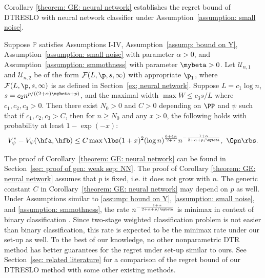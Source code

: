 \documentclass[preprint] {imsart}
\begin{document}
 Corollary \ref{theorem: GE: neural network} establishes the regret bound of  DTRESLO  with neural network classifier under Assumption~\ref{assumption: small noise}.
 \begin{corollary}
 \label{theorem: GE: neural network}
 Suppose $\mathbb P$ satisfies Assumptions I-IV,  Assumption~\ref{assump: bound on Y}, Assumption~\ref{assumption: small noise} with parameter $\alpha>0$, and Assumption~\ref{assumption: smmothness} with parameter $\mybeta>0$.
Let $\mathcal U_{n,1}$ and $\mathcal U_{n,2}$ be of the form $\mathcal F(L,\p, s, \infty)$ with appropriate  $\p_1$, where  $\mathcal F(L,\p, s, \infty)$ is as defined in Section~\ref{ex; neural network}. Suppose $L=c_1\log n$,  $s=c_2 n^{p/((2+\alpha)\mybeta+p)}$, and the maximal width $\max W\leq c_3 s/L$ where $c_1,c_2,c_3>0$. Then there exist $N_0>0$ and $C>0$ depending on $\PP$ and $\psi$ such that if $c_1,c_2,c_3>C$,  then for  $n\geq N_0$ and any $x>0$, the following holds with probability at least $1-\exp(-x)$:
 \[V^*_\psi-V_\psi(\hfa,\hfb)\leq C\max\lbs (1+x)^2(\log n)^{\frac{6+4\alpha}{2+\alpha}}n^{-\frac{1+\alpha}{2+\alpha+p/\mybeta}},\ \Opn\rbs.\]
 \end{corollary}
 The proof of Corollary~\ref{theorem: GE: neural network} can be found in Section~\ref{sec: proof of gen: weak sep: NN}. The proof of Corollary  \ref{theorem: GE: neural network} assumes that $p$ is fixed, i.e. it does not grow with $n$. The generic constant $C$ in Corollary~\ref{theorem: GE: neural network} may depend on $p$ as well.
 Under Assumptions similar to \ref{assump: bound on Y}, \ref{assumption: small noise}, and \ref{assumption: smmothness}, the rate $n^{-\frac{1+\alpha}{2+\alpha+p/\mybeta}}$ is minimax in context of binary classification \citep{audibert2007}. Since  two-stage weighted classification problem is not easier than binary classification,  this rate is expected to be the minimax rate under our set-up as well. To the best of our knowledge, no other nonparametric DTR method has better  guarantees for the regret under set-up similar to ours. See Section~\ref{sec: related literature} for a  comparison of the regret bound of our DTRESLO method with some other existing  methods.
  
\end{document}
